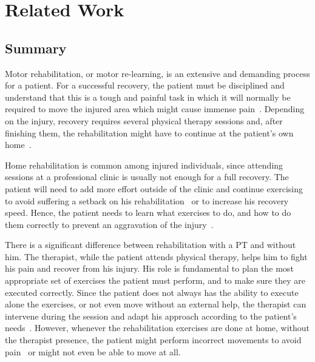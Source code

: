 \chapter{Related Work}
\label{section-related}

\section*{Summary}

Motor rehabilitation, or motor re-learning, is an extensive and demanding process for a patient.
For a successful recovery, the patient must be disciplined and understand that this is a tough and painful task in which it
will normally be required to move the injured area which might cause immense pain~\cite{Singh2014a}.
Depending on the injury, recovery requires several physical therapy sessions and, after finishing them, 
the rehabilitation might have to continue at the patient's own home~\cite{Lohse2013}.

Home rehabilitation is common among injured individuals, since
attending sessions at a professional clinic is usually not enough for a full recovery.
The patient will need to add more effort outside of the clinic and continue 
exercising to avoid suffering a setback on his rehabilitation~\cite{Borghese2013} 
or to increase his recovery speed. 
Hence, the patient needs to learn what exercises to do, and how to do 
them correctly to prevent an aggravation of the injury~\cite{Tang2014a}.

There is a significant difference between rehabilitation with a \ac{PT} and without him.
The therapist, while the patient attends physical therapy, helps him to fight his pain and recover from his injury.
His role is fundamental to plan the most appropriate set of exercises the patient must perform, and to make sure they are executed correctly. 
Since the patient does not always has the ability to execute alone the exercises, or not even move without an external help,
the therapist can intervene during the session and adapt his approach according to the patient's needs~\cite{Sigrist2013}.
However, whenever the rehabilitation exercises are done at home, without the therapist presence, the patient might 
perform incorrect movements to avoid pain~\cite{Tang2014a} or might not even be able to move at all.


